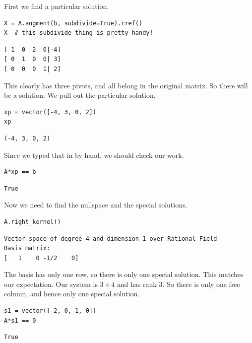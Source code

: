 \documentclass[10pt,]{book}
\theoremstyle{plain}
\theoremstyle{definition}
\numberwithin{equation}{section}
\begin{document}
        First we find a particular solution.
\begin{lstlisting}[style=sageinput]
X = A.augment(b, subdivide=True).rref()
X  # this subdivide thing is pretty handy!
\end{lstlisting}
\begin{lstlisting}[style=sageoutput]
[ 1  0  2  0|-4]
[ 0  1  0  0| 3]
[ 0  0  0  1| 2]
\end{lstlisting}
\par

        This clearly has three pivots, and all belong in the original matrix.
        So there will be a solution. We pull out the particular solution.
\begin{lstlisting}[style=sageinput]
xp = vector([-4, 3, 0, 2])
xp
\end{lstlisting}
\begin{lstlisting}[style=sageoutput]
(-4, 3, 0, 2)
\end{lstlisting}
\par

        Since we typed that in by hand, we should check our work.
\begin{lstlisting}[style=sageinput]
A*xp == b
\end{lstlisting}
\begin{lstlisting}[style=sageoutput]
True
\end{lstlisting}
\par

        Now we need to find the nullspace and the special solutions.
\begin{lstlisting}[style=sageinput]
A.right_kernel()
\end{lstlisting}
\begin{lstlisting}[style=sageoutput]
Vector space of degree 4 and dimension 1 over Rational Field
Basis matrix:
[   1    0 -1/2    0]
\end{lstlisting}
\par

        The basis has only one row, so there is only one special solution.
        This matches our expectation. Our system is \(3\times 4\) and has
        rank \(3\). So there is only one free column, and hence only one
        special solution.
\begin{lstlisting}[style=sageinput]
s1 = vector([-2, 0, 1, 0])
A*s1 == 0
\end{lstlisting}
\begin{lstlisting}[style=sageoutput]
True
\end{lstlisting}
\par
\end{document}
